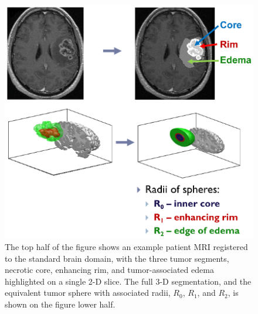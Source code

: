 \documentclass{aims}
\numberwithin{equation}{section}
\begin{document}
\begin{figure}
\begin{center}
\includegraphics[scale=0.81]{plots/radii_process.eps}\caption{\label{fig:radii_process} The top half of the figure shows an example patient MRI registered to the standard brain domain, with the three tumor segments, necrotic core, enhancing rim, and tumor-associated edema highlighted on a single 2-D slice.  The full 3-D segmentation, and the equivalent tumor sphere with associated radii, $R_0$, $R_1$, and $R_2$, is shown on the figure lower half.}
\end{center}
\end{figure}
\end{document}
